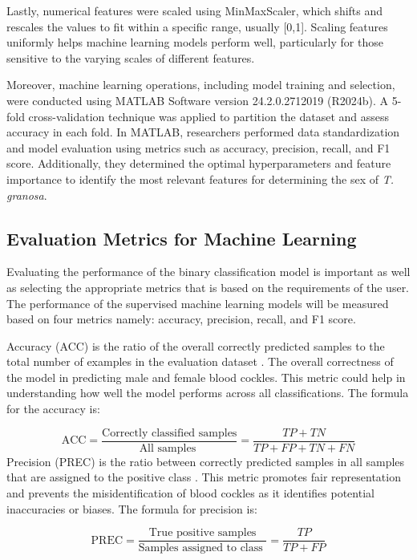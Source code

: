 Lastly, numerical features were scaled using MinMaxScaler, which shifts and rescales the values to fit within a specific range, usually [0,1]. Scaling features uniformly helps machine learning models perform well, particularly for those sensitive to the varying scales of different features.

Moreover, machine learning operations, including model training and selection, were conducted using MATLAB Software version 24.2.0.2712019 (R2024b). A 5-fold cross-validation technique was applied to partition the dataset and assess accuracy in each fold. In MATLAB, researchers performed data standardization and model evaluation using metrics such as accuracy, precision, recall, and F1 score. Additionally, they determined the optimal hyperparameters and feature importance to identify the most relevant features for determining the sex of \textit{T. granosa}.



\subsection{Evaluation Metrics for Machine Learning}
Evaluating the performance of the binary classification model is important as well as selecting the appropriate metrics that is based on the requirements of the user. The performance of the supervised machine learning models will be measured based on four metrics namely: accuracy, precision, recall, and F1 score. 

Accuracy (ACC) is the ratio of the overall correctly predicted samples to the total number of examples in the evaluation dataset \cite{cui2020}. The overall correctness of the model in predicting male and female blood cockles. This metric could help in understanding how well the model performs across all classifications. The formula for the accuracy is: 

\begin{equation}
	\text{ACC} = \frac{\text{Correctly classified samples}} {\text{All samples }} = \frac{TP+ TN}{TP + FP + TN + FN}
	\label{eq:acc}
\end{equation}
Precision (PREC) is the ratio between correctly predicted samples in all samples that are assigned to the positive class \cite{cui2020}. This metric promotes fair representation and prevents the misidentification of blood cockles as it identifies potential inaccuracies or biases. The formula for precision is:


\begin{equation}
	\text{PREC} = \frac{\text{True positive samples}} {\text{Samples assigned to class }} = \frac{TP}{TP + FP}
	\label{eq:prec}
\end{equation}

